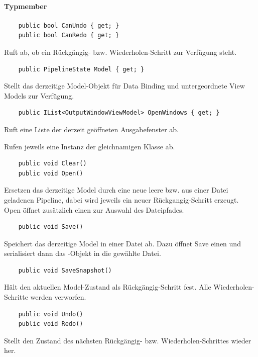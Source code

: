 \paragraph{Typmember}
\begin{itemize}

	\begin{verbatim}
	public bool CanUndo { get; }
	public bool CanRedo { get; }
	\end{verbatim}
	Ruft ab, ob ein Rückgängig- bzw. Wiederholen-Schritt zur Verfügung steht.

	\INPC
	\begin{verbatim}
	public PipelineState Model { get; }
	\end{verbatim}
	Stellt das derzeitige Model-Objekt für Data Binding und untergeordnete View Models zur Verfügung.

	\begin{verbatim}
	public IList<OutputWindowViewModel> OpenWindows { get; }
	\end{verbatim}
	Ruft eine Liste der derzeit geöffneten Ausgabefenster ab.


	Rufen jeweils eine Instanz der gleichnamigen Klasse ab.

	\begin{verbatim}
	public void Clear()
	public void Open()
	\end{verbatim}
	Ersetzen das derzeitige Model durch eine neue leere bzw. aus einer Datei geladenen Pipeline, dabei wird jeweils ein neuer Rückgangig-Schritt erzeugt. Open öffnet zusätzlich einen  zur Auswahl des Dateipfades.

	\begin{verbatim}
	public void Save()
	\end{verbatim}
	Speichert das derzeitige Model in einer Datei ab. Dazu öffnet Save einen  und serialisiert dann das -Objekt in die gewählte Datei.

	\begin{verbatim}
	public void SaveSnapshot()
	\end{verbatim}
	Hält den aktuellen Model-Zustand als Rückgängig-Schritt fest. Alle Wiederholen-Schritte werden verworfen.

	\begin{verbatim}
	public void Undo()
	public void Redo()
	\end{verbatim}
	Stellt den Zustand des nächsten Rückgängig- bzw. Wiederholen-Schrittes wieder her.

\end{itemize}

